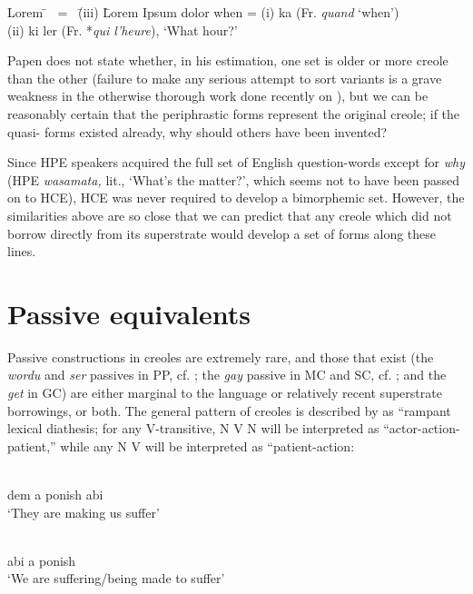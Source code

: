 \ea\label{ex:2:85} \begin{tabbing}	Lorem \= ~{\rm =}~ \= {\rm (iii)} \= Lorem Ipsum dolor \kill
					when \> {\rm =} \> {\rm (i)} \> ka {\rm (Fr. {\it quand} `when')}\\
					\> \> {\rm (ii)} \> ki ler {\rm (Fr. *{\it qui l'heure}), `What hour?'}\end{tabbing}\z
Papen does not state whether, in his estimation, one set is older or more creole than the other (failure to make any serious attempt to sort variants is a grave weakness in the otherwise thorough work done recently on ), but we can be reasonably certain that the periphrastic forms represent the original creole; if the quasi- forms existed already, why should others have been invented?

Since HPE speakers acquired the full set of English question-words except for \textit{why} (HPE \textit{wasamata,} lit., `What's the matter?', which seems not to have been passed on to HCE), HCE was never required to develop a bimorphemic set. However, the similarities above are so close that we can predict that any creole which did not borrow directly from its superstrate would develop a set of forms along these lines.

\section{Passive equivalents}

Passive constructions in creoles are extremely rare, and those that exist (the \textit{wordu} and \textit{ser} passives in PP, cf. \citealt{MarkeyEtAl1980}; the \textit{gay} passive in MC and SC, cf. \citealt{Corne1977}; and the \textit{get}  in
GC) are either marginal to the language or relatively recent super\-strate borrowings, or both. The general pattern of creoles is described by \citet{MarkeyEtAl1980} as ``rampant lexical diathesis{\textquotedbl}; for any V-transitive, N V N will be interpreted as ``actor-action-patient,'' while any N V will be interpreted as ``patient-action{\textquotedbl}:

\ea\label{ex:2:86}
 \langinfo{\langGC}{}{}\\
 dem a ponish abi\\
\glt `They are making us suffer'
\z

\ea\label{ex:2:87}
\langinfo{\langGC}{}{}\\
abi a ponish\\
\glt `We are suffering/being made to suffer'
\z

